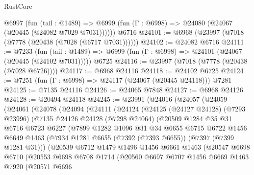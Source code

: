 \begin{lexlean}{RustCore}
\begin{coremodule}
    @6997
      (fun (tail : @1489) =>
      @6999 (fun (Γ : @6998) => @24080 (@24067 (@20445 (@24082 @7029 @7031))))))
    @6716
@24101 := @6968 (@23997 (@7018 (@7778 (@20438 (@7028 (@6717 @7031))))))
@24102 := @24082 @6716
@24111 := @7233
    (fun (tail : @1489) => @6999 (fun (Γ : @6998) => @24101 (@24067 (@20445 (@24102 @7031)))))
    @6725
@24116 := @23997 (@7018 (@7778 (@20438 (@7028 @6726))))
@24117 := @6968 @24116
@24118 := @24102 @6725
@24124 := @7251 (fun (Γ : @6998) => @24117 (@24067 (@20445 @24118))) @7281
@24125 := @7135 @24116
@24126 := @24065 @7848
@24127 := @6968 @24126
@24128 := @20494 @24118
@24245 := @23991
    (@24016
      (@24057
        (@24059
          (@24061
            (@24078
              (@24094
                (@24111
                  (@24124
                    (@24125
                      (@24127 @24128)
                      (@7293 @23996)
                      (@7135
                        @24126
                        @24128
                        (@7298 @24064)
                        (@20509
                          @1284
                          @35
                          @31
                          @6716
                          @6723
                          @6227
                          (@7899
                            @1282
                            @1096
                            @31
                            @34
                            @6655
                            @6715
                            @6722
                            @1456
                            @6649
                            @1463
                            (@7934 @1281 @6655 (@7392 (@7393 @6655)) (@7397 (@7399 @1281 @31)))
                            (@20539
                              @6712
                              @1479
                              @1496
                              @1456
                              @6661
                              @1463
                              (@20547
                                @6698
                                @6710
                                (@20553
                                  @6698
                                  @6708
                                  @1714
                                  (@20560
                                    @6697
                                    @6707
                                    @1456
                                    @6669
                                    @1463
                                    @7920
                                    (@20571
                                      @6696

\end{coremodule}
\end{lexlean}
